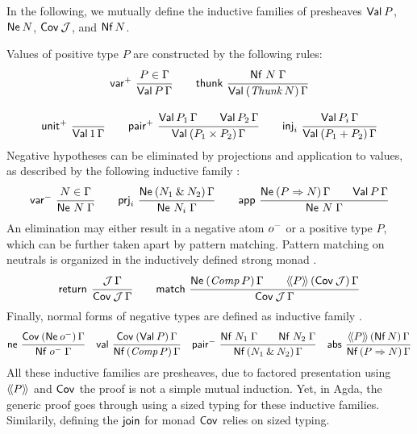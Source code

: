 \documentclass[a4paper,USenglish,cleveref, autoref]{lipics-v2019}
\begin{document}
In the following, we mutually define the inductive families of
presheaves $\mathsf{Val}^{}\,P$,
$\mathsf{Ne}^{}\,N$, $\mathsf{Cov}^{}\,\mathcal{J}$,
and $\mathsf{Nf}\,N$.

Values 
of positive type $P$ are constructed by the
following rules:
\begin{gather*}
  \nru{\pvar}{P \in \Gamma}{\PVal P \Gamma}
\qquad
  \nru{\tthunk}{\Nf N \Gamma}{\PValP{\Thunk N}\Gamma}
\\[2ex]
  \nru{\punit}{}{\PVal{\tyone}\Gamma}
\qquad
  \nru{\ppair}
      {\PVal{P_1}\Gamma \qquad \PVal{P_2}\Gamma}
      {\PValP{P_1 \times P_2}\Gamma}
\qquad
  \nru{\tinj_i}{\PVal{P_i}\Gamma}{\PValP{P_1 + P_2}\Gamma}
\end{gather*}
Negative hypotheses can be eliminated by projections and application
to values, as described by the following inductive family
:
\begin{gather*}
  \nru{\nvar}{N \in \Gamma}{\Ne N \Gamma}
\qquad
  \nru{\tprj_i}
      {\NeP {N_1 \ntimes N_2} \Gamma}
      {\Ne {N_i} \Gamma}
\qquad
  \nru{\tapp}
      {\NeP {P \To N} \Gamma \qquad \PVal P \Gamma}
      {\Ne N \Gamma}
\end{gather*}
An elimination may either result in a negative atom $o^-$ or a
positive type $P$, which can be further taken apart by pattern
matching.  Pattern matching on neutrals is organized in the
inductively defined strong monad \fbox{$\Cov$}.
\begin{gather*}
  \nru{\treturn}{\J\,\Gamma}{\Cover \J \Gamma}
\qquad
  \nru{\tmatch}
      {\NeP {\Comp P} \Gamma \qquad \AddHypP P {\Cov\,\J} \Gamma}
      {\Cover \J \Gamma}
\end{gather*}
Finally, normal forms of negative types are defined as inductive
family .
\begin{gather*}
  \nru{\tne}
      {\CoverP {\tNe\,\natom} \Gamma}
      {\Nf {\natom} \Gamma}
\quad
  \nru{\tval}
      {\CoverP {\tVal\,P}  \Gamma}
      {\NfP {\Comp P} \Gamma}
\quad
  \nru{\npair}
      {\Nf {N_1} \Gamma \qquad \Nf {N_2} \Gamma}
      {\NfP {N_1 \ntimes N_2} \Gamma}
\quad
  \nru{\tabs}
      {\AddHypP P {\tNf\, N} \Gamma}
      {\NfP {P \To N} \Gamma}
\end{gather*}
All these inductive families are presheaves, due to factored
presentation using $\langle\!\langle P \rangle\!\rangle$ and $\Cov$ the proof is not a simple
mutual induction.  Yet, in Agda, the generic proof goes through using a sized
typing for these inductive families.  Similarily, defining the
$\mathsf{join}^{}$ for monad $\Cov$ relies on sized typing.
\end{document}
